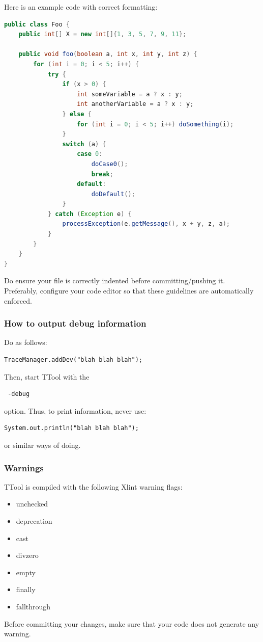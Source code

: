\documentclass[12pt]{article}
\begin{document}
Here is an example code with correct formatting:

\begin{lstlisting}[showspaces=true, language=java, commentstyle=\color{pgreen},
keywordstyle=\color{pblue}, stringstyle=\color{pred}, basicstyle=\ttfamily]
public class Foo {
    public int[] X = new int[]{1, 3, 5, 7, 9, 11};

    public void foo(boolean a, int x, int y, int z) {
        for (int i = 0; i < 5; i++) {
            try {
                if (x > 0) {
                    int someVariable = a ? x : y;
                    int anotherVariable = a ? x : y;
                } else {
                    for (int i = 0; i < 5; i++) doSomething(i);
                }
                switch (a) {
                    case 0:
                        doCase0();
                        break;
                    default:
                        doDefault();
                }
            } catch (Exception e) {
                processException(e.getMessage(), x + y, z, a);
            }
        }
    }
}
\end{lstlisting}

Do ensure your file is correctly indented before committing/pushing it.
Preferably, configure your code editor so that these guidelines are
automatically enforced.


\subsubsection{How to output debug information}
Do as follows:
\begin{lstlisting}
TraceManager.addDev("blah blah blah");
\end{lstlisting}
Then, start TTool with the 
\begin{verbatim}
 -debug
\end{verbatim}
option.
Thus, to print information, never use:
\begin{lstlisting}
System.out.println("blah blah blah");
\end{lstlisting}
or similar ways of doing.

\subsubsection{Warnings}
TTool is compiled with the following Xlint warning flags:
\begin{itemize}
    \item unchecked
    \item deprecation
    \item cast
    \item divzero
    \item empty
    \item finally
    \item fallthrough
\end{itemize}
Before committing your changes, make sure that your code does not generate any
warning.
\end{document}
